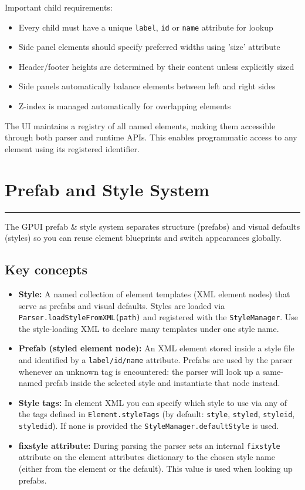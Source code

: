 \documentclass[a4paper,11pt]{article}
\begin{document}
Important child requirements:
\begin{itemize}
    \item Every child must have a unique \texttt{label}, \texttt{id} or \texttt{name} attribute for lookup
    \item Side panel elements should specify preferred widths using 'size' attribute
    \item Header/footer heights are determined by their content unless explicitly sized
    \item Side panels automatically balance elements between left and right sides
    \item Z-index is managed automatically for overlapping elements
\end{itemize}

The UI maintains a registry of all named elements, making them accessible through both parser and runtime APIs. This enables programmatic access to any element using its registered identifier.

\newpage
\section*{Prefab and Style System}
\vspace{-1.2em}
\rule{\linewidth}{0.4pt}
The GPUI prefab \& style system separates structure (prefabs) and visual defaults (styles) so you can reuse element blueprints and switch appearances globally.

\subsection*{Key concepts}
\begin{itemize}
    \item \textbf{Style:} A named collection of element templates (XML element nodes) that serve as prefabs and visual defaults. Styles are loaded via \texttt{Parser.loadStyleFromXML(path)} and registered with the \texttt{StyleManager}. Use the style-loading XML to declare many templates under one style name.
    \item \textbf{Prefab (styled element node):} An XML element stored inside a style file and identified by a \texttt{label/id/name} attribute. Prefabs are used by the parser whenever an unknown tag is encountered: the parser will look up a same-named prefab inside the selected style and instantiate that node instead.
    \item \textbf{Style tags:} In element XML you can specify which style to use via any of the tags defined in \texttt{Element.styleTags} (by default: \texttt{style}, \texttt{styled}, \texttt{styleid}, \texttt{styledid}). If none is provided the \texttt{StyleManager.defaultStyle} is used.
    \item \textbf{fixstyle attribute:} During parsing the parser sets an internal \texttt{fixstyle} attribute on the element attributes dictionary to the chosen style name (either from the element or the default). This value is used when looking up prefabs.
\end{itemize}
\end{document}
